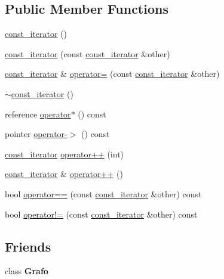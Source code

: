 \subsection*{Public Member Functions}
\begin{DoxyCompactItemize}
\item 
\hyperlink{classGrafo_1_1const__iterator_afcfb368167c1949b56e8f8b0b9c24402}{const\+\_\+iterator} ()
\item 
\hyperlink{classGrafo_1_1const__iterator_a3b00734352764f21e47bcce86ab4d2fe}{const\+\_\+iterator} (const \hyperlink{classGrafo_1_1const__iterator}{const\+\_\+iterator} \&other)
\item 
\hyperlink{classGrafo_1_1const__iterator}{const\+\_\+iterator} \& \hyperlink{classGrafo_1_1const__iterator_a62111ac18ba2d3262984c00b30e98c7b}{operator=} (const \hyperlink{classGrafo_1_1const__iterator}{const\+\_\+iterator} \&other)
\item 
\hyperlink{classGrafo_1_1const__iterator_a606a1974a27b2cccb8bacd85c9f748e1}{$\sim$const\+\_\+iterator} ()
\item 
reference \hyperlink{classGrafo_1_1const__iterator_aa25a4fda1bd56ab6f1e8066f547c77fb}{operator$\ast$} () const
\item 
pointer \hyperlink{classGrafo_1_1const__iterator_ae0416460fa3e72996ec1bbd1d9150780}{operator-\/$>$} () const
\item 
\hyperlink{classGrafo_1_1const__iterator}{const\+\_\+iterator} \hyperlink{classGrafo_1_1const__iterator_a6830f02c3e63342d3a3023410fa45ffa}{operator++} (int)
\item 
\hyperlink{classGrafo_1_1const__iterator}{const\+\_\+iterator} \& \hyperlink{classGrafo_1_1const__iterator_a57e23174372e4703e134ce2b35a0567b}{operator++} ()
\item 
bool \hyperlink{classGrafo_1_1const__iterator_ac035050bf14134f1587cb0d047bac405}{operator==} (const \hyperlink{classGrafo_1_1const__iterator}{const\+\_\+iterator} \&other) const
\item 
bool \hyperlink{classGrafo_1_1const__iterator_a79963290c733e39cac4e4a38a14879bb}{operator!=} (const \hyperlink{classGrafo_1_1const__iterator}{const\+\_\+iterator} \&other) const
\end{DoxyCompactItemize}
\subsection*{Friends}
\begin{DoxyCompactItemize}
\item 
\mbox{\label{classGrafo_1_1const__iterator_aa89bd7919924d99b99ffa9ab271175a3}} 
class {\bfseries Grafo}
\end{DoxyCompactItemize}


